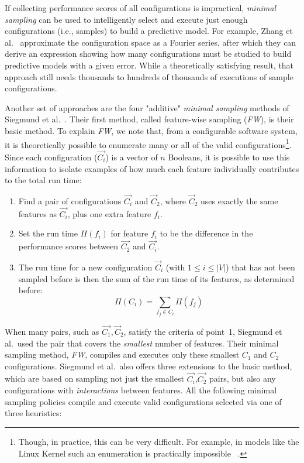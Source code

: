 \documentclass{newsig}
\begin{document}
 If collecting performance scores of all configurations is impractical,  {\em minimal sampling} 
 can be used to intelligently select and execute just enough configurations (i.e., samples) to build a
 predictive model.
 For example, Zhang et al.~\cite{zhang2015performance} approximate the
configuration space as a Fourier series, after which they can derive an expression showing how many configurations must be studied
 to build predictive models with a given error. While a theoretically satisfying result, that approach still needs thousands to hundreds of thousands of executions of sample
 configurations.  

Another set of approaches are the four "additive" {\em minimal sampling} methods of Siegmund et al.~\cite{siegmund2012predicting}.
Their first method, called feature-wise sampling ({\em FW}), is their basic method.
To explain {\em FW}, we note that, from a configurable software system, it is theoretically possible to enumerate many or all of the valid configurations\footnote{Though, in practice, this can be very difficult. For example, in models like the Linux Kernel such an enumeration is practically impossible ~\cite{sayyad13b}.}. 
Since each configuration ($\vec{C_i}$) is a vector of $n$ Booleans, it  is possible to use this information to isolate examples of how much each feature individually contributes to the total run time:
\begin{enumerate}
\item Find a pair of  configurations $\vec{C_i}$ and $\vec{C}_2$, where $\vec{C}_2$ uses exactly the same features as $\vec{C_i}$, plus one  extra feature $f_i$.
\item Set the run time $\Pi(f_i)$ for feature $f_i$ to be the difference in the performance scores between $\vec{C_2}$ and $\vec{C_i}$.
\item The run time  for a new configuration  $\vec{C}_i$ (with $1\leq i\leq \left\vert{V}\right\vert$) that has not been sampled before is then the sum of the run time of its features, as determined before:
\begin{equation}
  \Pi(C_i) = \sum_{f_j \in C_i}\Pi(f_j)  
\end{equation}
\end{enumerate}

When many pairs, such as ${\vec{C_1},\vec{C}_2}$, satisfy the criteria of point~1, Siegmund et al.\ used the 
pair that covers the {\em smallest} number of features. Their minimal sampling method, {\em FW},
compiles and executes only these smallest $C_1$ and $C_2$ configurations. 
Siegmund et al.\ also offers three extensions to the basic method, which are based on sampling
not just the smallest $\vec{C_i}$,$\vec{C_2}$  pairs, but also any configurations with {\em interactions} between features. 
All the following minimal sampling policies compile and   execute valid configurations selected via one of three heuristics:
\end{document}
